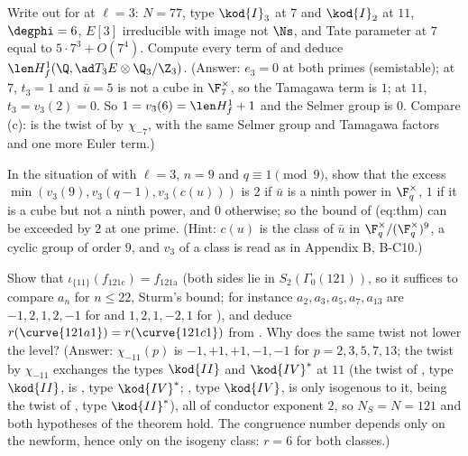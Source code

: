 \begin{exercise}\label{ex:congruence:ex-77c}
Write out  for  at $\ell=3$: $N=77$, type $\kod{I}_3$ at $7$ and $\kod{I}_2$ at $11$, $\degphi=6$, $E[3]$ irreducible with image not $\Ns$, and Tate parameter at $7$ equal to
$5\cdot7^3+O(7^4)$. Compute every term of  and deduce $\len H^1_f(\Q,\ad T_3E\otimes\Q_3/\Z_3)$. (Answer: $e_3=0$ at both primes (semistable); at $7$, $t_3=1$ and $\bar u=5$ is not a cube in $\F_7^\times$,
so the Tamagawa term is $1$; at $11$, $t_3=v_3(2)=0$. So $1=v_3(6)=\len H^1_f+1$ and the Selmer group is $0$. Compare (c):  is the twist of  by
$\chi_{-7}$, with the same Selmer group and Tamagawa factors and one more Euler term.)
\end{exercise}

\begin{exercise}\label{ex:congruence:ex-ko}
In the situation of  with $\ell=3$, $n=9$ and $q\equiv1\pmod9$, show that the excess $\min(v_3(9),v_3(q-1),v_3(c(u)))$ is $2$ if $\bar u$ is a ninth power in $\F_q^\times$, $1$ if it is a cube but
not a ninth power, and $0$ otherwise; so the bound of (eq:thm) can be exceeded by $2$ at one prime. (Hint: $c(u)$ is the class of $\bar u$ in $\F_q^\times/(\F_q^\times)^{9}$, a cyclic group of order $9$, and $v_3$ of a class is
read as in Appendix B, B-C10.)
\end{exercise}

\begin{exercise}\label{ex:congruence:ex-121}
Show that $\iota_{\{11\}}(f_{\text{121c}})=f_{\text{121a}}$ (both sides lie in $S_2(\Gamma_0(121))$, so it suffices to compare $a_n$ for $n\le22$, Sturm's bound; for instance $a_2,a_3,a_5,a_7,a_{13}$ are $-1,2,1,2,-1$ for  and $1,2,1,-2,1$ for ), and deduce $r(\curve{121a1})=r(\curve{121c1})$ from . Why does the same twist not lower the level? (Answer: $\chi_{-11}(p)$ is $-1,+1,+1,-1,-1$ for $p=2,3,5,7,13$; the twist by $\chi_{-11}$ exchanges the types $\kod{II}$
and $\kod{IV}^*$ at $11$ (the twist of , type $\kod{II}$, is , type $\kod{IV}^*$; , type $\kod{IV}$, is only isogenous to it, being the twist of , type $\kod{II}^*$), all of
conductor exponent $2$, so $N_S=N=121$ and both hypotheses of the theorem hold. The congruence number depends only on the newform, hence only on the isogeny class: $r=6$ for both classes.)
\end{exercise}

